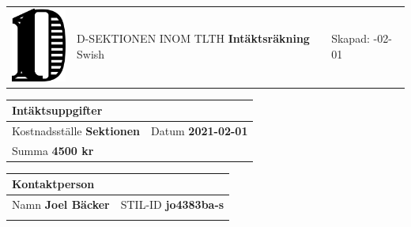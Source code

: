 \documentclass{article}
\newcommand{\skapad}{2021-02-01}
\newcommand{\kostnadsstalle}{Sektionen}
\newcommand{\typ}{Swish}
\newcommand{\datum}{2021-02-01}
\newcommand{\summa}{4500 kr}
\newcommand{\namn}{Joel Bäcker}
\newcommand{\stilid}{jo4383ba-s}
\begin{document}
\hspace{-0.3in}
\begin{tabular}{p{1.0in}p{3.5in}p{2in}}
    \includegraphics[width=0.8in]{D-symbol.pdf} &
    \vspace{-1in}
    {\large \uppercase{D-sektionen inom TLTH}} \newline \newline
    {\Huge \textsf{\textbf{Intäktsräkning}}}
    \newline \newline
    {\large \typ}&
    \vspace{-1in}
    Skapad: \newline
    \skapad \newline
\end{tabular}

\vspace{0.5in}
\hspace{-0.3in}
\begin{tabular}{|p{1.4in}|p{0.9in}|}
    \multicolumn{2}{l}{Intäktsuppgifter} \\
    \hline
    {\footnotesize Kostnadsställe} \newline \textbf{\kostnadsstalle}&
    {\footnotesize Datum} \newline \textbf{\datum} \\
    \hline
    \multicolumn{2}{|p{2.3in}|}{{\footnotesize Summa} \newline \textbf{\summa}} \\
    \hline
\end{tabular}
\hspace{0.1in}
\begin{tabular}{|p{1.3in}|p{0.9in}|p{1.1in}|}
    \multicolumn{3}{l}{Kontaktperson} \\
    \hline
    \multicolumn{2}{|p{2.2in}|}{{\footnotesize Namn} \newline \textbf{\namn}}
      &
     {\footnotesize STIL-ID} \newline \textbf{\stilid} \\
     \hline
     \multicolumn{3}{p{3.3in}}{{\footnotesize \quad} \newline \textbf{\quad}} %
\end{tabular}
\end{document}
